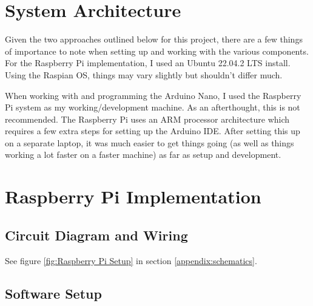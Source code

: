 \documentclass{article}
\begin{document}
\begin{multicols}{2}
		\section{System Architecture}
		Given the two approaches outlined below for this project, there are a few things of importance to note when setting up and working with the various components. For the Raspberry Pi implementation, I used an Ubuntu 22.04.2 LTS install. Using the Raspian OS, things may vary slightly but shouldn't differ much.
		
		When working with and programming the Arduino Nano, I used the Raspberry Pi system as my working/development machine. As an afterthought, this is not recommended. The Raspberry Pi uses an ARM processor architecture which requires a few extra steps for setting up the Arduino IDE. After setting this up on a separate laptop, it was much easier to get things going (as well as things working a lot faster on a faster machine) as far as setup and development.
		
		\section{Raspberry Pi Implementation}
		
		\subsection{Circuit Diagram and Wiring}
		See figure \ref{fig:Raspberry Pi Setup} in section \ref{appendix:schematics}.
		
		\subsection{Software Setup}
		

\end{multicols}
\end{document}
